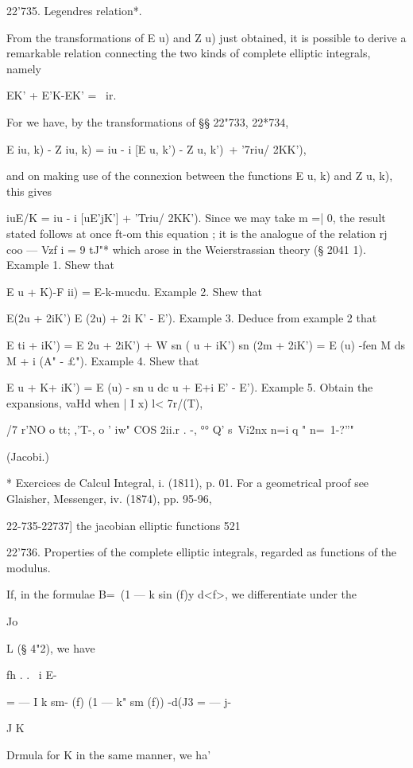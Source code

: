 22'735. Legendres relation*. 

From the transformations of E u) and Z u) just obtained, it is possible 
to derive a remarkable relation connecting the two kinds of complete elliptic 
integrals, namely 

EK' + E'K-EK' = \ ir. 

For we have, by the transformations of §§ 22"733, 22*734, 

E  iu, k) - Z  iu, k) = iu - i [E u, k') - Z  u, k')\ + '7riu/ 2KK'), 

and on making use of the connexion between the functions E  u, k) and 
Z  u, k), this gives 

iuE/K = iu - i [uE'jK'] + 'Triu/ 2KK'). 
Since we may take m =|  0, the result stated follows at once ft-om this 
equation ; it is the analogue of the relation rj coo — Vzf i = 9 tJ"* which arose in 
the Weierstrassian theory (§ 2041 1). 
Example 1. Shew that 

E u + K)-F ii) = E-k-mucdu. 
Example 2. Shew that 

E(2u + 2iK')  E (2u) + 2i  K' - E'). 
Example 3. Deduce from example 2 that 

E  ti + iK') =  E 2u + 2iK') + W sn  ( u + iK') sn (2m + 2iK') 
= E (u) -fen M ds M + i (A" - £"). 
Example 4. Shew that 

E  u + K+ iK') = E (u) - sn u dc u + E+i  E' - E'). 
Example 5. Obtain the expansions, vaHd when | I x) l< 7r/(T), 

/7 r'NO o tt; ,'T-,   o '  iw" COS 2ii.r .  -, °° Q' s\ Vi2nx 
n=i  q " n=\ 1-?''" 

(Jacobi.) 

* Exercices de Calcul Integral, i. (1811), p. 01. For a geometrical proof see Glaisher, 
Messenger, iv. (1874), pp. 95-96, 



22-735-22737] the jacobian elliptic functions 521 

22'736. Properties of the complete elliptic integrals, regarded as functions 
of the modulus. 



If, in the formulae B=\ (1 — k  sin  (f)y d<f>, we differentiate under the 

Jo 

L (§ 4"2), we have 

fh  . . \ i E- 

= — I k sm- (f) (1 — k" sm  (f)) -d(J3 = — j- 

J K 

Drmula for K in the same manner, we ha' 

